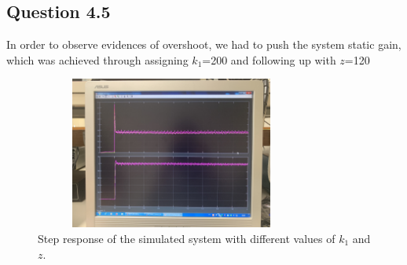 \documentclass[a4paper,8pt]{extarticle}
\begin{document}
        \subsection*{Question 4.5}
        In order to observe evidences of overshoot, we had to push the system static gain, which was achieved through assigning $k_1$=200 and following up with $z$=120
          \begin{figure}[ht]
            \centering
             \captionsetup{justification=centering,margin=2cm}            \includegraphics[width=9cm,height=5cm]{4_5.jpg} 
            \caption{Step response of the simulated system with different values of $k_1$ and $z$.}
        \end{figure}
    
\end{document}
